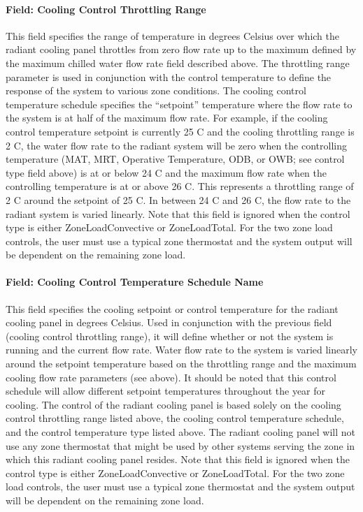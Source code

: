 \paragraph{Field: Cooling Control Throttling Range}

This field specifies the range of temperature in degrees Celsius over which the radiant cooling panel throttles from zero flow rate up to the maximum defined by the maximum chilled water flow rate field described above. The throttling range parameter is used in conjunction with the control temperature to define the response of the system to various zone conditions. The cooling control temperature schedule specifies the “setpoint” temperature where the flow rate to the system is at half of the maximum flow rate. For example, if the cooling control temperature setpoint is currently 25 C and the cooling throttling range is 2 C, the water flow rate to the radiant system will be zero when the controlling temperature (MAT, MRT, Operative Temperature, ODB, or OWB; see control type field above) is at or below 24 C and the maximum flow rate when the controlling temperature is at or above 26 C. This represents a throttling range of 2 C around the setpoint of 25 C. In between 24 C and 26 C, the flow rate to the radiant system is varied linearly.  Note that this field is ignored when the control type is either ZoneLoadConvective or ZoneLoadTotal.  For the two zone load controls, the user must use a typical zone thermostat and the system output will be dependent on the remaining zone load.

\paragraph{Field: Cooling Control Temperature Schedule Name}

This field specifies the cooling setpoint or control temperature for the radiant cooling panel in degrees Celsius. Used in conjunction with the previous field (cooling control throttling range), it will define whether or not the system is running and the current flow rate. Water flow rate to the system is varied linearly around the setpoint temperature based on the throttling range and the maximum cooling flow rate parameters (see above). It should be noted that this control schedule will allow different setpoint temperatures throughout the year for cooling. The control of the radiant cooling panel is based solely on the cooling control throttling range listed above, the cooling control temperature schedule, and the control temperature type listed above. The radiant cooling panel will not use any zone thermostat that might be used by other systems serving the zone in which this radiant cooling panel resides.  Note that this field is ignored when the control type is either ZoneLoadConvective or ZoneLoadTotal.  For the two zone load controls, the user must use a typical zone thermostat and the system output will be dependent on the remaining zone load.

